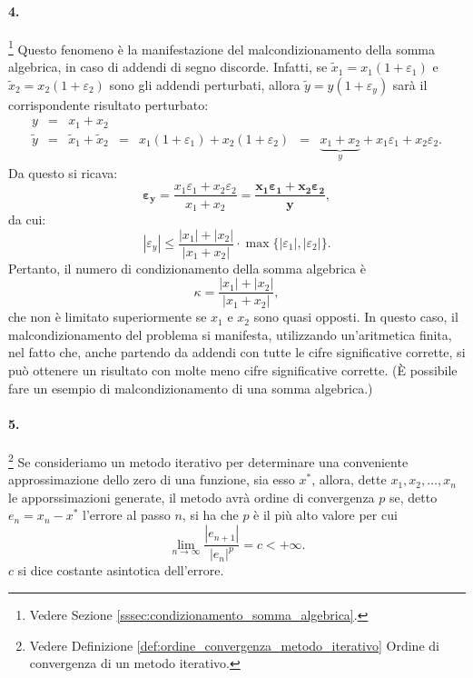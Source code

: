 \paragraph{4.}\footnote{Vedere Sezione \ref{sssec:condizionamento_somma_algebrica}.} Questo fenomeno è la manifestazione del malcondizionamento della somma algebrica, in caso di addendi di segno discorde. Infatti, se $\tilde x_1 = x_1 (1+\varepsilon_1)$ e $\tilde x_2 = x_2 (1 + \varepsilon_2)$ sono gli addendi perturbati, allora $\tilde y = y (1 + \varepsilon_y)$ sarà il corrispondente risultato perturbato:
\begin{equation*}
	\begin{matrix}
		y &=& x_1 + x_2\\
		\tilde y &=& \tilde x_1 + \tilde x_2 &=& x_1(1+\varepsilon_1) + x_2 (1+\varepsilon_2) &=& \underbrace{x_1 + x_2}_{y} + x_1 \varepsilon_1 + x_2 \varepsilon_2.
	\end{matrix}
\end{equation*}
Da questo si ricava:
\begin{equation*}
	\boldsymbol{\varepsilon_y} = \frac{x_1\varepsilon_1+x_2\varepsilon_2}{x_1+x_2}= \boldsymbol{\frac{x_1\varepsilon_1+x_2\varepsilon_2}{y}},
\end{equation*}
da cui:
\begin{equation*}
	|\varepsilon_y|\leq \frac{|x_1|+|x_2|}{|x_1+x_2|} \cdot \max{\{|\varepsilon_1|,|\varepsilon_2|\}}.
\end{equation*}
Pertanto, il numero di condizionamento della somma algebrica è
\begin{equation*}
	\kappa=\frac{|x_1|+|x_2|}{|x_1+x_2|},
\end{equation*}
che non è limitato superiormente se $x_1$ e $x_2$ sono quasi opposti. In questo caso, il malcondizionamento del problema si manifesta, utilizzando un'aritmetica finita, nel fatto che, anche partendo da addendi con tutte le cifre significative corrette, si può ottenere un risultato con molte meno cifre significative corrette. (È possibile fare un esempio di malcondizionamento di una somma algebrica.)

\paragraph{5.}\footnote{Vedere Definizione \ref{def:ordine_convergenza_metodo_iterativo} Ordine di convergenza di un metodo iterativo.} Se consideriamo un metodo iterativo per determinare una conveniente approssimazione dello zero di una funzione, sia esso $x^*$, allora, dette $x_1, x_2,\hdots, x_n$ le apporssimazioni generate, il metodo avrà ordine di convergenza $p$ se, detto $e_n=x_n-x^*$ l'errore al passo $n$, si ha che  $p$ è il più alto valore per cui
\begin{equation*}
	\lim_{n\rightarrow\infty}\frac{|e_{n+1}|}{|e_n|^p}=c<+\infty.
\end{equation*}
$c$ si dice costante asintotica dell'errore.
